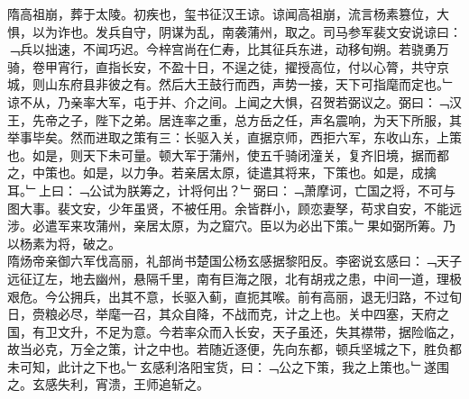隋高祖崩，葬于太陵。初疾也，玺书征汉王谅。谅闻高祖崩，流言杨素篡位，大惧，以为诈也。发兵自守，阴谋为乱，南袭蒲州，取之。司马参军裴文安说谅曰：﹁兵以拙速，不闻巧迟。今梓宫尚在仁寿，比其征兵东进，动移旬朔。若骁勇万骑，卷甲宵行，直指长安，不盈十日，不逞之徒，擢授高位，付以心膂，共守京城，则山东府县非彼之有。然后大王鼓行而西，声势一接，天下可指麾而定也。﹂谅不从，乃亲率大军，屯于并、介之间。上闻之大惧，召贺若弼议之。弼曰：﹁汉王，先帝之子，陛下之弟。居连率之重，总方岳之任，声名震响，为天下所服，其举事毕矣。然而进取之策有三：长驱入关，直据京师，西拒六军，东收山东，上策也。如是，则天下未可量。顿大军于蒲州，使五千骑闭潼关，复齐旧境，据而都之，中策也。如是，以力争。若亲居太原，徒遣其将来，下策也。如是，成擒耳。﹂上曰：﹁公试为朕筹之，计将何出？﹂弼曰：﹁萧摩诃，亡国之将，不可与图大事。裴文安，少年虽贤，不被任用。余皆群小，顾恋妻孥，苟求自安，不能远涉。必遣军来攻蒲州，亲居太原，为之窟穴。臣以为必出下策。﹂果如弼所筹。乃以杨素为将，破之。
\\
隋炀帝亲御六军伐高丽，礼部尚书楚国公杨玄感据黎阳反。李密说玄感曰：﹁天子远征辽左，地去幽州，悬隔千里，南有巨海之限，北有胡戎之患，中间一道，理极艰危。今公拥兵，出其不意，长驱入蓟，直扼其喉。前有高丽，退无归路，不过旬日，赍粮必尽，举麾一召，其众自降，不战而克，计之上也。关中四塞，天府之国，有卫文升，不足为意。今若率众而入长安，天子虽还，失其襟带，据险临之，故当必克，万全之策，计之中也。若随近逐便，先向东都，顿兵坚城之下，胜负都未可知，此计之下也。﹂玄感利洛阳宝货，曰：﹁公之下策，我之上策也。﹂遂围之。玄感失利，宵溃，王师追斩之。
